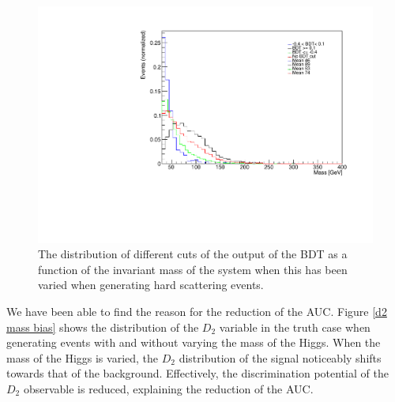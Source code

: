\documentclass[10pt,a4paper]{book}
\begin{document}
\begin{figure}
\centering
\includegraphics[scale=0.6]{ch4_images/bdt_cuts_mass_bias}
\caption{The distribution of different cuts of the output of the BDT as a function of the invariant mass of the system when this has been varied when generating hard scattering events.}
\label{bdt inv mass}
\end{figure}

We have been able to find the reason for the reduction of the AUC. Figure \ref{d2 mass bias} shows the distribution of the $D_2$ variable in the truth case when generating events with and without varying the mass of the Higgs. When the mass of the Higgs is varied, the $D_2$ distribution of the signal noticeably shifts towards that of the background. Effectively, the discrimination potential of the $D_2$ observable is reduced, explaining the reduction of the AUC.
\end{document}
